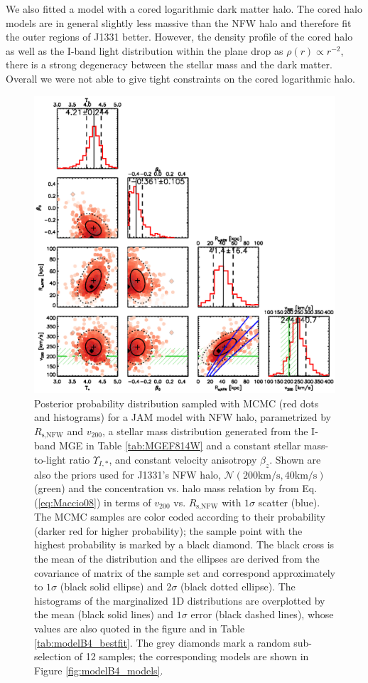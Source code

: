 We also fitted a model with a cored logarithmic dark matter halo. The cored halo models are in general slightly less massive than the NFW halo and therefore fit the outer regions of J1331 better. However, the density profile of the cored halo as well as the I-band light distribution within the plane drop as $\rho(r) \propto r^{-2}$, there is a strong degeneracy between the stellar mass and the dark matter. Overall we were not able to give tight constraints on the cored logarithmic halo.

\begin{figure}
\centering
\includegraphics[width=0.9\linewidth]{fig/B4_contour_plot_short.ps}
\caption{Posterior probability distribution sampled with MCMC (red dots and histograms) for a JAM model with NFW halo, parametrized by $R_\text{s,NFW}$ and $v_\text{200}$, a stellar mass distribution generated from the I-band MGE in Table \ref{tab:MGEF814W} and a constant stellar mass-to-light ratio $\Upsilon_{I,*}$, and constant velocity anisotropy $\beta_z$. Shown are also the priors used for J1331's NFW halo, $\mathscr{N}(200 \text{km/s},40 \text{km/s})$ (green) and the concentration vs. halo mass relation by \citet{Maccio08} from Eq. (\ref{eq:Maccio08}) in terms of $v_{200}$ vs. $R_\text{s,NFW}$ with $1\sigma$ scatter (blue). The MCMC samples are color coded according to their probability (darker red for higher probability); the sample point with the highest probability is marked by a black diamond. The black cross is the mean of the distribution and the ellipses are derived from the covariance of matrix of the sample set and correspond approximately to $1\sigma$ (black solid ellipse) and $2\sigma$ (black dotted ellipse). The histograms of the marginalized 1D distributions are overplotted by the mean (black solid lines) and $1\sigma$ error (black dashed lines), whose values are also quoted in the figure and in Table \ref{tab:modelB4_bestfit}. The grey diamonds mark a random sub-selection of 12 samples; the corresponding models are shown in Figure \ref{fig:modelB4_models}.}
\label{fig:modelB4_triangle}
\end{figure}

